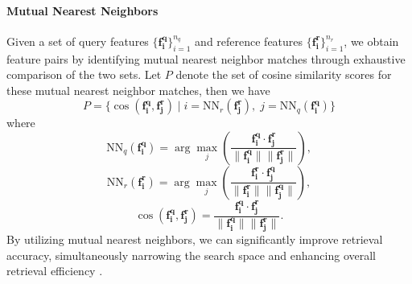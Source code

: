 \vspace{-6pt}
\paragraph{Mutual Nearest Neighbors} Given a set of query features \(\{\mathbf{f_i^q}\}_{i=1}^{n_q}\) and reference features \(\{\mathbf{f_i^r}\}_{i=1}^{n_r}\), we obtain feature pairs by identifying mutual nearest neighbor matches through exhaustive comparison of the two sets. Let \(P\) denote the set of cosine similarity scores for these mutual nearest neighbor matches, then we have
\begin{equation}
    P = \{\cos(\mathbf{f_i^q}, \mathbf{f_j^r}) \mid i = \text{NN}_r(\mathbf{f_j^r}), \; j = \text{NN}_q(\mathbf{f_i^q})\}
    \label{eq:mutual nearest neighbors}
\end{equation}
where
\begin{equation}
    \text{NN}_q(\mathbf{f_i^q}) = \arg\max_{j} \left( \frac{\mathbf{f_i^q} \cdot \mathbf{f_j^r}}{\|\mathbf{f_i^q}\| \|\mathbf{f_j^r}\|} \right),
\end{equation}
\begin{equation}
    \text{NN}_r(\mathbf{f_i^r}) = \arg\max_{j} \left( \frac{\mathbf{f_i^r} \cdot \mathbf{f_j^q}}{\|\mathbf{f_i^r}\| \|\mathbf{f_j^q}\|} \right),
\end{equation}
\begin{equation}
    \cos(\mathbf{f_i^q}, \mathbf{f_j^r}) = \frac{\mathbf{f_i^q} \cdot \mathbf{f_j^r}}{\|\mathbf{f_i^q}\| \|\mathbf{f_j^r}\|}.
\end{equation}
By utilizing mutual nearest neighbors, we can significantly improve retrieval accuracy, simultaneously narrowing the search space and enhancing overall retrieval efficiency \cite{zhong2017reranking}.

\vspace{-6pt}
